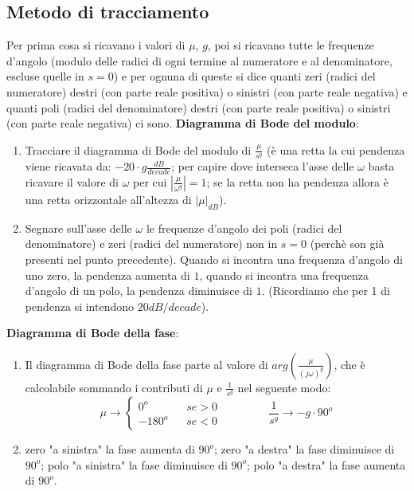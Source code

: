     \subsection{Metodo di tracciamento}
    Per prima cosa si ricavano i valori di $\mu$, $g$, poi si ricavano tutte le frequenze d'angolo (modulo delle radici di ogni termine al numeratore e al denominatore, escluse quelle in $s=0$) e per ognuna di queste si dice quanti zeri (radici del numeratore) destri (con parte reale positiva) o sinistri (con parte reale negativa) e quanti poli (radici del denominatore) destri (con parte reale positiva) o sinistri (con parte reale negativa) ci sono.\newline
    \newline
    \textbf{Diagramma di Bode del modulo}: 
    \begin{enumerate}
        \item Tracciare il diagramma di Bode del modulo di $\frac{\mu}{s^g}$ (è una retta la cui pendenza viene ricavata da: $-20 \cdot g \frac{dB}{decade}$; per capire dove interseca l'asse delle $\omega$ basta ricavare il valore di $\omega$ per cui $\left| \frac{\mu}{\omega^g} \right| = 1$; se la retta non ha pendenza allora è una retta orizzontale all'altezza di $|\mu|_{dB}$).
        \item Segnare sull'asse delle $\omega$ le frequenze d'angolo dei poli (radici del denominatore) e zeri (radici del numeratore) non in $s=0$ (perchè son già presenti nel punto precedente).\newline
        Quando si incontra una frequenza d'angolo di uno zero, la pendenza aumenta di $1$, quando si incontra una frequenza d'angolo di un polo, la pendenza diminuisce di $1$. (Ricordiamo che per 1 di pendenza si intendono $20 dB/decade$).
    \end{enumerate}
    \textbf{Diagramma di Bode della fase}:
    \begin{enumerate}
        \item Il diagramma di Bode della fase parte al valore di $arg(\frac{\mu}{(j \omega)^g})$, che è calcolabile sommando i contributi di $\mu$ e $\frac{1}{s^g}$ nel seguente modo:
        \[
            \mu \rightarrow \begin{cases}
                0^o \;\;\;& se > 0\\
                -180^o \;\;\; & se <0
            \end{cases} \;\;\;\;\;\;\;\;\;\;\;\;\;\;\; \frac{1}{s^g}\rightarrow -g \cdot 90^o
        \]
        \item zero "a sinistra" la fase aumenta di $90^o$;\newline
        zero "a destra" la fase diminuisce di $90^o$;\newline
        polo "a sinistra" la fase diminuisce di $90^o$;\newline
        polo "a destra" la fase aumenta di $90^o$.
    \end{enumerate}
